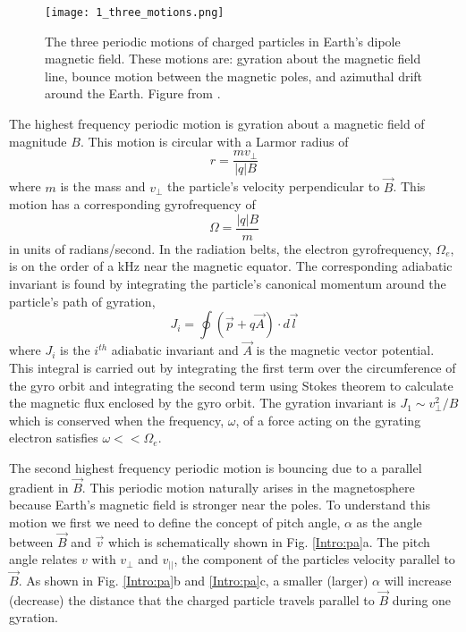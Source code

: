 \begin{figure}
\texttt{[image: 1\_three\_motions.png]}
\caption{The three periodic motions of charged particles in Earth's dipole magnetic field. These motions are: gyration about the magnetic field line, bounce motion between the magnetic poles, and azimuthal drift around the Earth. Figure from \citep{Baumjohann1997}.}
\label{Intro:motion_diagram}
\end{figure}


The highest frequency periodic motion is gyration about a magnetic field of magnitude $B$. This motion is circular with a Larmor radius of 
\begin{equation}
r = \frac{m v_\perp}{|q| B}
\end{equation} where $m$ is the mass and $v_\perp$ the particle's velocity perpendicular to $\vec{B}$. This motion has a corresponding gyrofrequency of
\begin{equation}
\Omega = \frac{|q| B}{m}
\end{equation} in units of radians/second. In the radiation belts, the electron gyrofrequency, $\Omega_e$, is on the order of a kHz near the magnetic equator. The corresponding adiabatic invariant is found by integrating the particle's canonical momentum around the particle's path of gyration,
\begin{equation} \label{J}
J_i = \oint (\vec{p} + q \vec{A}) \cdot d\vec{l}
\end{equation} where $J_i$ is the $i^{th}$ adiabatic invariant and $\vec{A}$ is the magnetic vector potential. This integral is carried out by integrating the first term over the circumference of the gyro orbit and integrating the second term using Stokes theorem to calculate the magnetic flux enclosed by the gyro orbit.  The gyration invariant is $J_1 \sim v_\perp^2 / B$ which is conserved when the frequency, $\omega$, of a force acting on the gyrating electron satisfies $\omega << \Omega_e$.

The second highest frequency periodic motion is bouncing due to a parallel gradient in $\vec{B}$. This periodic motion naturally arises in the magnetosphere because Earth's magnetic field is stronger near the poles. To understand this motion we first we need to define the concept of pitch angle, $\alpha$ as the angle between $\vec{B}$ and $\vec{v}$ which is schematically shown in Fig. \ref{Intro:pa}a. The pitch angle relates $v$ with $v_\perp$ and $v_{||}$, the component of the particles velocity parallel to $\vec{B}$. As shown in Fig. \ref{Intro:pa}b and \ref{Intro:pa}c, a smaller (larger) $\alpha$ will increase (decrease) the distance that the charged particle travels parallel to $\vec{B}$ during one gyration.

